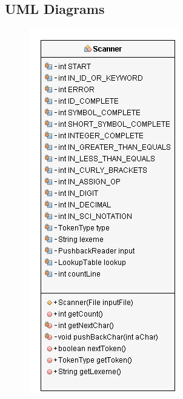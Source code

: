 \documentclass[10]{article}
\begin{document}
\begin{appendices}
\section{UML Diagrams}
\begin{figure}
	\includegraphics{ScannerUML.png}
\end{figure}
\begin{figure}

\end{figure}
\end{appendices}
\end{document}
